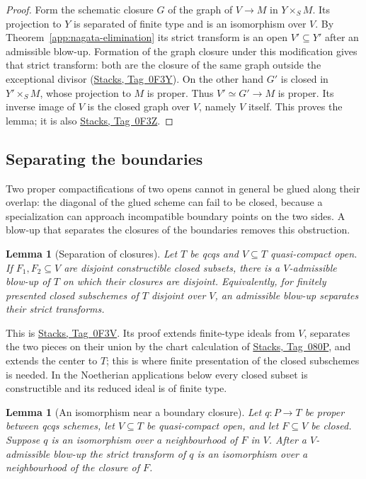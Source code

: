 \documentclass[11pt,a4paper]{article}
\numberwithin{equation}{section}
\newtheorem{lemma}[theorem]{Lemma}
\theoremstyle{definition}
\theoremstyle{remark}
\newcommand{\stacks}[1]{\href{https://stacks.math.columbia.edu/tag/#1}{\textnormal{Stacks, Tag~#1}}}
\begin{document}
\begin{proof}
Form the schematic closure $G$ of the graph of $V\to M$ in
$Y\times_SM$. Its projection to $Y$ is separated of finite type
and is an isomorphism over $V$. By
Theorem~\ref{app:nagata-elimination} its strict transform is an open
$V'\subseteq Y'$ after an admissible blow-up. Formation of the
graph closure under this modification gives that strict transform:
both are the closure of the same graph outside the exceptional
divisor (\stacks{0F3Y}). On the other hand $G'$ is closed in
$Y'\times_SM$, whose projection to $M$ is proper. Thus
$V'\simeq G'\to M$ is proper. Its inverse image of $V$ is the
closed graph over $V$, namely $V$ itself. This proves the lemma;
it is also \stacks{0F3Z}.
\end{proof}

\subsection{Separating the boundaries}
\label{app:nagata-boundaries}

Two proper compactifications of two opens cannot in general be glued
along their overlap: the diagonal of the glued scheme can fail to be
closed, because a specialization can approach incompatible boundary
points on the two sides. A blow-up that separates the closures of the
boundaries removes this obstruction.

\begin{lemma}[Separation of closures]
\label{app:nagata-separation}
Let $T$ be qcqs and $V\subseteq T$ quasi-compact open.
If $F_1,F_2\subseteq V$ are disjoint constructible closed subsets,
there is a $V$-admissible blow-up of $T$ on which their closures are
disjoint. Equivalently, for finitely presented closed subschemes of
$T$ disjoint over $V$, an admissible blow-up separates their strict
transforms.
\end{lemma}

This is \stacks{0F3V}. Its proof extends finite-type ideals from $V$,
separates the two pieces on their union by the chart calculation of
\stacks{080P}, and extends the center to $T$; this is where finite
presentation of the closed subschemes is needed. In the Noetherian
applications below every closed subset is constructible and its
reduced ideal is of finite type.

\begin{lemma}[An isomorphism near a boundary closure]
\label{app:nagata-near-closure}
Let $q:P\to T$ be proper between qcqs schemes, let $V\subseteq T$
be quasi-compact open, and let $F\subseteq V$ be closed. Suppose
$q$ is an isomorphism over a neighbourhood of $F$ in $V$.
After a $V$-admissible blow-up the strict transform of $q$ is an
isomorphism over a neighbourhood of the closure of $F$.
\end{lemma}
\end{document}
